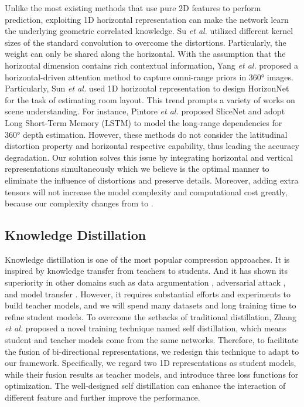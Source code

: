 \documentclass[runningheads]{llncs}
\begin{document}
	Unlike the most existing methods that use pure 2D features to perform prediction, exploiting 1D horizontal representation can make the network learn the underlying geometric correlated knowledge.
	Su \emph{et al.} \cite{su2017learning} utilized different kernel sizes of the standard convolution to overcome the distortions.
	Particularly, the weight can only be shared along the horizontal.
	With the assumption that the horizontal dimension contains rich contextual information, Yang \emph{et al.} \cite{yang2021capturing} proposed a horizontal-driven attention method to capture omni-range priors in 360° images.
	Particularly, Sun \emph{et al.} \cite{sun2021hohonet} used 1D horizontal representation to design HorizonNet for the task of estimating room layout.
	This trend prompts a variety of works on scene understanding.
	For instance, Pintore \emph{et al.} \cite{pintore2021slicenet} proposed SliceNet and adopt Long Short-Term Memory (LSTM) to model the long-range dependencies for 360° depth estimation.
	However, these methods do not consider the latitudinal distortion property and horizontal respective capability, thus leading the accuracy degradation.
	Our solution solves this issue by integrating horizontal and vertical representations simultaneously which we believe is the optimal manner to eliminate the influence of distortions and preserve details.
	Moreover, adding extra tensors will not increase the model complexity and computational cost greatly, because our complexity changes from  to .
	
	\subsection{Knowledge Distillation}
	
	Knowledge distillation \cite{hinton2015distilling} is one of the most popular compression approaches.
	It is inspired by knowledge transfer from teachers to students.
	And it has shown its superiority in other domains such as data argumentation \cite{bagherinezhad2018label}, adversarial attack \cite{papernot2016distillation}, and model transfer \cite{gupta2016cross}.
	However, it requires substantial efforts and experiments to build teacher models, and we will spend many datasets and long training time to refine student models.
	To overcome the setbacks of traditional distillation, Zhang \emph{et al.}\cite{zhang2019your} proposed a novel training technique named self distillation, which means student and teacher models come from the same networks.
	Therefore, to facilitate the fusion of bi-directional representations, we redesign this technique to adapt to our framework.
	Specifically, we regard two 1D representations as student models, while their fusion results as teacher models, and introduce three loss functions for optimization.
	The well-designed self distillation can enhance the interaction of different feature and further improve the performance.
	
\end{document}
